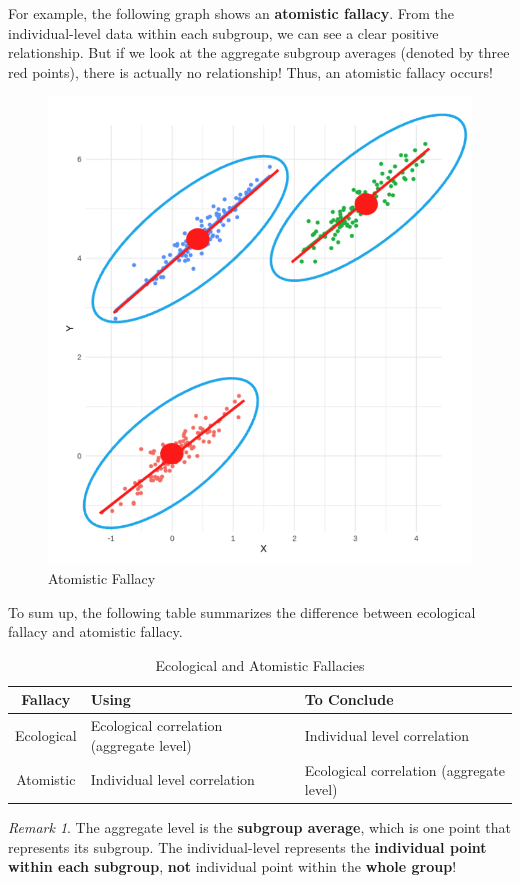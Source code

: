 \documentclass[math,code]{amznotes}
\theoremstyle{remark}
\newtheorem*{remark}{Remark}
\begin{document}
For example, the following graph shows an \textbf{atomistic fallacy}. From the individual-level data within each subgroup, we can see a clear positive relationship. But if we look at the aggregate subgroup averages (denoted by three red points), there is actually no relationship! Thus, an atomistic fallacy occurs!
\begin{figure}[H]
    \centering
    \includegraphics[width=0.3\linewidth]{images/chapter3-atomistic-fallacy.png}
    \caption{Atomistic Fallacy}
    \label{fig:chapter3-atomistic-fallacy}
\end{figure}
To sum up, the following table summarizes the difference between ecological fallacy and atomistic fallacy. \\
\begin{table}[h]
\centering
\begin{tabular}{|c|p{4.5cm}|p{4.5cm}|}
\hline
\textbf{Fallacy} & \textbf{Using} & \textbf{To Conclude} \\ \hline
Ecological & Ecological correlation (aggregate level) & Individual level correlation \\ \hline
Atomistic & Individual level correlation & Ecological correlation (aggregate level) \\ \hline
\end{tabular}
\caption{Ecological and Atomistic Fallacies}
\end{table}
\begin{notebox}
    \begin{remark}
        The aggregate level is the \textbf{subgroup average}, which is one point that represents its subgroup. The individual-level represents the \textbf{individual point within each subgroup}, \textbf{not} individual point within the \textbf{whole group}!
    \end{remark}
\end{notebox}
\end{document}
